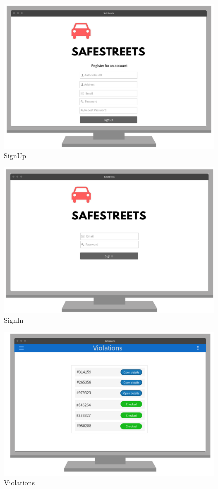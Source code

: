 \documentclass{article}
\begin{document}
\begin{figure}[H]
    \centering
    \includegraphics[scale=0.35]{Images/WEBSignUp}
    \caption{SignUp}
\end{figure}
\begin{figure}[H]
    \centering
    \includegraphics[scale=0.35]{Images/WEBSignIn}
    \caption{SignIn}
\end{figure}
\begin{figure}[H]
    \centering
    \includegraphics[scale=0.35]{Images/WEBViolations}
    \caption{Violations}
\end{figure}
\end{document}
